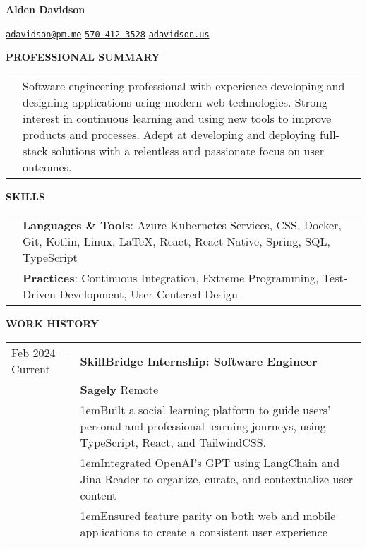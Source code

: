 \documentclass[11pt]{article}
\newlength{\dateColumnWidth}
\newcommand{\customBulletLabel}{\raisebox{0.4ex}{\tiny$\bullet$}}
\newcommand{\detail}{\par\noindent\makebox[1em][l]{\customBulletLabel}\hangindent1em}
\begin{document}
\begin{center}
    \begin{minipage}{0.70\textwidth}
        {\Huge\textbf{Alden Davidson}}
    \end{minipage}%
    \begin{minipage}{0.30\textwidth}
        \raggedleft
        \href{mailto:adavidson@pm.me}{\nolinkurl{adavidson@pm.me}}
        \href{tel:5704123528}{\nolinkurl{570-412-3528}}
        \href{https://adavidson.us}{\nolinkurl{adavidson.us}}
    \end{minipage}
\end{center}
{\Large \textbf{PROFESSIONAL SUMMARY}}
\bigbreak
\begin{tabularx}{\textwidth}{@{}p{\dateColumnWidth}X@{}}
     & Software engineering professional with experience developing and designing applications using modern web technologies.
    Strong interest in continuous learning and using new tools to improve products and processes.
    Adept at developing and deploying full-stack solutions with a relentless and passionate focus on user outcomes.
\end{tabularx}
\bigbreak
{\Large \textbf{SKILLS}}
\bigbreak
\begin{tabularx}{\textwidth}{@{}p{\dateColumnWidth}X@{}}
     & \textbf{Languages \& Tools}: Azure Kubernetes Services, CSS, Docker, Git, Kotlin, Linux, \LaTeX, React, React Native, Spring, SQL, TypeScript \\
     & \textbf{Practices}: Continuous Integration, Extreme Programming, Test-Driven Development, User-Centered Design                                \\
\end{tabularx}
\bigbreak
{\Large \textbf{WORK HISTORY}}
\bigbreak
\begin{tabularx}{\textwidth}{@{}p{\dateColumnWidth}X@{}}
    Feb 2024 -- Current & \textbf{SkillBridge Internship: Software Engineer}                                                                                              \\
                        & \textbf{Sagely} \textbar{} Remote                                                                                                               \\
                        & \detail Built a social learning platform to guide users' personal and professional learning journeys, using TypeScript, React, and TailwindCSS. \\
                        & \detail Integrated OpenAI's GPT using LangChain and Jina Reader to organize, curate, and contextualize user content                             \\
                        & \detail Ensured feature parity on both web and mobile applications to create a consistent user experience                                       \\
\end{tabularx}
\end{document}
